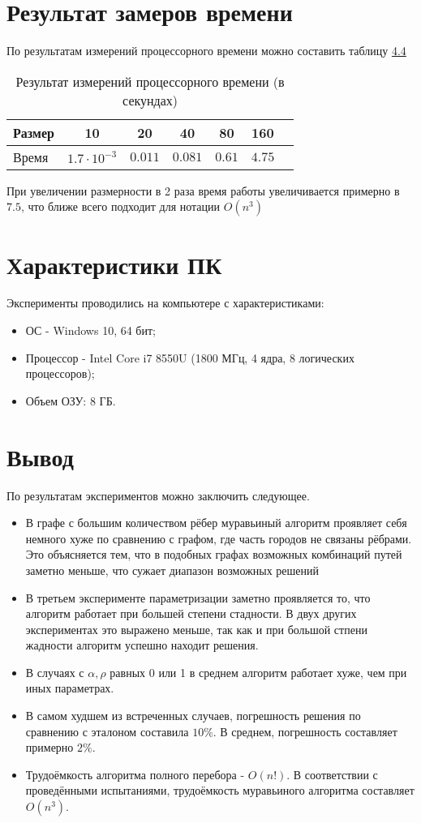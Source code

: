 \section{Результат замеров времени}
По результатам измерений процессорного времени можно составить таблицу
\hyperref[table_4_4]{4.4}

\begin{table}[h] \label{table_4_4}
	\caption{Результат измерений процессорного времени (в секундах)}
	\begin{tabular}{| p{5.0cm} | c | c | c | c | c | c |}
		\hline
		Размер				&10					&20			&40			&80			&160	\\ \hline
		Время				&$1.7\cdot10^{-3}$	&$0.011$	&$0.081$	&$0.61$ 	&$4.75$	\\
	\end{tabular}
\end{table}

При увеличении размерности в 2 раза время работы увеличивается примерно в $7.5$, что ближе всего подходит для нотации $O(n^{3})$

\section{Характеристики ПК}
Эксперименты проводились на компьютере с характеристиками:
\begin{itemize}
	\item ОС - Windows 10, 64 бит;
	\item Процессор -  Intel Core i7 8550U (1800 МГц, 4 ядра, 8 логических процессоров);
	\item Объем ОЗУ: 8 ГБ.
\end{itemize}

\section*{Вывод}
По результатам экспериментов можно заключить следующее.
\begin{itemize}
	\item В графе с большим количеством рёбер муравьиный алгоритм проявляет себя немного хуже по сравнению с графом, где часть городов не связаны рёбрами. Это объясняется тем, что в подобных графах возможных комбинаций путей заметно меньше, что сужает диапазон возможных решений
	\item В третьем эксперименте параметризации заметно проявляется то, что алгоритм работает при большей степени стадности. В двух других экспериментах это выражено меньше, так как и при большой стпени жадности алгоритм успешно находит решения.
	\item В случаях с $\alpha, \rho$ равных 0 или 1 в среднем алгоритм работает хуже, чем при иных параметрах.
	\item В самом худшем из встреченных случаев, погрешность решения по сравнению с эталоном составила $10\%$. В среднем, погрешность составляет примерно $2\%$.
	\item Трудоёмкость алгоритма полного перебора - $O(n!)$. В соответствии с проведёнными испытаниями, трудоёмкость муравьиного алгоритма составляет $O(n^{3})$.
\end{itemize}


	
